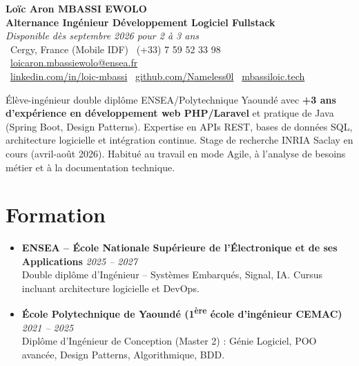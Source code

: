 \documentclass[a4paper,11pt]{article}
\begin{document}
\begin{center}
    {\Large \textbf{Loïc Aron MBASSI EWOLO}} \\ \vspace{4pt}
    \textbf{\large Alternance Ingénieur Développement Logiciel Fullstack} \\
    \textit{\small Disponible dès septembre 2026 pour 2 à 3 ans} \\ \vspace{4pt}
    \small
    \faMapMarker\ Cergy, France (Mobile IDF) \quad
    \faPhone\ (+33) 7 59 52 33 98 \quad
    \faEnvelope\ \href{mailto:loicaron.mbassiewolo@ensea.fr}{loicaron.mbassiewolo@ensea.fr} \\ \vspace{2pt}
    \faLinkedin\ \href{https://www.linkedin.com/in/loic-mbassi/}{linkedin.com/in/loic-mbassi} \quad
    \faGithub\ \href{https://github.com/Nameless0l}{github.com/Nameless0l} \quad
    \faGlobe\ \href{https://mbassiloic.tech}{mbassiloic.tech}
\end{center}

\vspace{-6pt}

\noindent\small{Élève-ingénieur double diplôme ENSEA/Polytechnique Yaoundé avec \textbf{+3 ans d'expérience en développement web PHP/Laravel} et pratique de Java (Spring Boot, Design Patterns). Expertise en APIs REST, bases de données SQL, architecture logicielle et intégration continue. Stage de recherche INRIA Saclay en cours (avril-août 2026). Habitué au travail en mode Agile, à l'analyse de besoins métier et à la documentation technique.}

\section{Formation}
\begin{itemize}[leftmargin=*, label=\tiny$\bullet$, nosep]
    \item \textbf{ENSEA -- École Nationale Supérieure de l'Électronique et de ses Applications} \hfill \textit{2025 -- 2027} \\
    \small{Double diplôme d'Ingénieur -- Systèmes Embarqués, Signal, IA. Cursus incluant architecture logicielle et DevOps.}
    \item \textbf{École Polytechnique de Yaoundé (1\textsuperscript{ère} école d'ingénieur CEMAC)} \hfill \textit{2021 -- 2025} \\
    \small{Diplôme d'Ingénieur de Conception (Master 2) : Génie Logiciel, POO avancée, Design Patterns, Algorithmique, BDD.}
\end{itemize}
\end{document}
